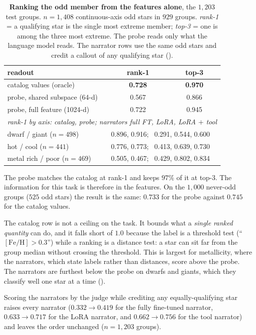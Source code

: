 \begin{table}[h]\centering\small
\caption{\textbf{Ranking the odd member from the features alone}, the $1{,}203$ test groups.
$n{=}1{,}408$ continuous-axis odd stars in $929$ groups. \emph{rank-1} = a qualifying star
is the single most extreme member; \emph{top-3} = one is among the three most extreme. The
probe reads only what the language model reads. The narrator rows use the same odd stars and
credit a callout of any qualifying star ().}
\label{tab:probe}
\begin{tabular}{lcc}
\toprule
readout & rank-1 & top-3 \\
\midrule
catalog values (oracle)       & \textbf{0.728} & \textbf{0.970} \\
probe, shared subspace (64-d) & 0.567 & 0.866 \\
probe, full feature (1024-d)  & 0.722 & 0.945 \\
\midrule
\multicolumn{3}{l}{\emph{rank-1 by axis: catalog, probe; narrators full FT, LoRA, LoRA $+$ tool}}\\
dwarf / giant ($n=498$)     & \multicolumn{2}{l}{0.896, 0.916; \ 0.291, 0.544, 0.600} \\
hot / cool ($n=441$)        & \multicolumn{2}{l}{0.776, 0.773; \ 0.413, 0.639, 0.730} \\
metal rich / poor ($n=469$) & \multicolumn{2}{l}{0.505, 0.467; \ 0.429, 0.802, 0.834} \\
\bottomrule
\end{tabular}
\end{table}

The probe matches the catalog at rank-1 and keeps $97\%$ of it at top-3. The information for
this task is therefore in the features. On the $1{,}000$ never-odd groups ($525$ odd stars) the
result is the same: $0.733$ for the probe against $0.745$ for the catalog values.

The catalog row is not a ceiling on the task. It bounds what a \emph{single ranked quantity}
can do, and it falls short of $1.0$ because the label is a threshold test
(``$[\mathrm{Fe/H}] > 0.3$'') while a ranking is a distance test: a star can sit far from the
group median without crossing the threshold. This is largest for metallicity, where the
narrators, which state labels rather than distances, score above the probe. The narrators are
furthest below the probe on dwarfs and giants, which they classify well one star at a time
().

Scoring the narrators by the judge while crediting any equally-qualifying star raises every
narrator ($0.332 \to 0.419$ for the fully fine-tuned narrator, $0.633 \to 0.717$ for the LoRA
narrator, and $0.662 \to 0.756$ for the tool narrator) and leaves the order unchanged
($n{=}1{,}203$ groups).

